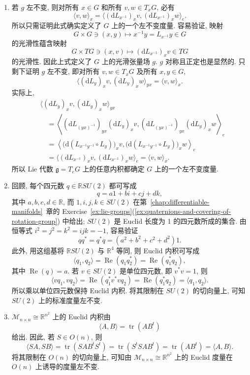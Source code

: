\begin{description}[font=\normalfont,leftmargin=2em,labelwidth=1.5em]
\begin{enumerate}[label=(\alph*),ref=\alph*,leftmargin=*]
\item 若 $g$ 左不变, 则对所有 $x\in G$ 和所有 $v,w\in T_xG$, 必有
\[
  \langle v,w\rangle_x
  =\langle(\mathrm{d}L_{x^{-1}})_xv,(\mathrm{d}L_{x^{-1}})_xw\rangle_e.
\]
所以只需证明此式确实定义了 $G$ 上的一个左不变度量. 容易验证, 映射
\[
  G\times G\ni(x,y)\mapsto x^{-1}y=L_{x^{-1}}y\in G
\]
的光滑性蕴含映射
\[
  G\times TG\ni(x,v)\mapsto(\mathrm{d}L_{x^{-1}})_xv\in TG
\]
的光滑性. 因此上式定义了 $G$ 上的光滑张量场 $g$. $g$ 对称且正定也是显然的. 只剩下证明 $g$ 左不变, 即对所有 $v,w\in T_xG$ 及所有 $x,y\in G$,
\[
  \langle(\mathrm{d}L_y)_xv,(\mathrm{d}L_y)_xw\rangle_{yx}=\langle v,w\rangle_x.
\]
实际上,
\begin{align*}
  &\langle(\mathrm{d}L_y)_xv,(\mathrm{d}L_y)_xw\rangle_{yx}\\
  &\quad=\left\langle(\mathrm{d}L_{(yx)^{-1}})_{yx}(\mathrm{d}L_y)_xv,
                     (\mathrm{d}L_{(yx)^{-1}})_{yx}(\mathrm{d}L_y)_xw\right\rangle_e\\
  &\quad=\left\langle\bigl(\mathrm{d}(L_{x^{-1}y^{-1}}\circ L_y)\bigr)_xv,
                     \bigl(\mathrm{d}(L_{x^{-1}y^{-1}}\circ L_y)\bigr)_xw\right\rangle_e\\
  &\quad=\langle(\mathrm{d}L_{x^{-1}})_xv,(\mathrm{d}L_{x^{-1}})_xw\rangle_e=\langle v,w\rangle_x.
\end{align*}
所以 Lie 代数 $\mathfrak g=T_eG$ 上的任意内积都确定 $G$ 上的一个左不变度量.
\item 回顾, 每个四元数 $q\in\mathbb{R}SU(2)$ 都可写成
\[
  q=a1+bi+cj+dk,
\]
其中 $a,b,c,d\in\mathbb{R}$, 而 $1,i,j,k\in SU(2)$ 在第~\ref{chap:differentiable-manifolds}~章的 Exercise~\ref{ex:lie-groups}(\ref{ex:quaternions-and-covering-of-rotation-group}) 中给出; $SU(2)$ 是 Euclid 长度为 1 的四元数所成的集合. 由恒等式 $i^2=j^2=k^2=ijk=-1$, 容易验证
\[
  qq^*=q^*q=(a^2+b^2+c^2+d^2)1.
\]
此外, 用这组基将 $\mathbb{R}SU(2)$ 与 $\mathbb{R}^4$ 等同, 则 Euclid 内积可写成
\[
  \langle q_1,q_2\rangle=\operatorname{Re}(q_1q_2^*)=\operatorname{Re}(q_1^*q_2),
\]
其中 $\operatorname{Re}(q)=a$. 若 $v\in SU(2)$ 是单位四元数, 即 $v^*v=1$, 则
\[
  \langle vq_1,vq_2\rangle=\operatorname{Re}(q_1^*v^*vq_2)
  =\operatorname{Re}(q_1^*q_2)=\langle q_1,q_2\rangle.
\]
所以乘以单位四元数保持 Euclid 内积. 将其限制在 $SU(2)$ 的切向量上, 可知 $SU(2)$ 上的标准度量左不变.
\item $\mathcal{M}_{n\times n}\cong\mathbb{R}^{n^2}$ 上的 Euclid 内积由
\[
  \langle A,B\rangle=\operatorname{tr}(AB^t)
\]
给出. 因此, 若 $S\in O(n)$, 则
\[
  \langle SA,SB\rangle=\operatorname{tr}(SAB^tS^t)
  =\operatorname{tr}(S^tSAB^t)=\operatorname{tr}(AB^t)=\langle A,B\rangle.
\]
将其限制在 $O(n)$ 的切向量上, 可知由 $\mathcal{M}_{n\times n}\cong\mathbb{R}^{n^2}$ 上的 Euclid 度量在 $O(n)$ 上诱导的度量左不变.
\end{enumerate}
\end{description}
